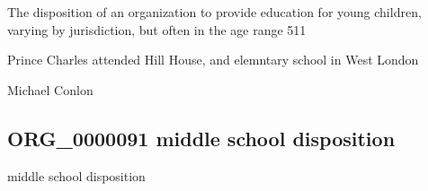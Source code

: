 \documentclass[letterpaper,10pt,english]{sphinxmanual}
\begin{document}
\begin{sphinxShadowBox}

\sphinxAtStartPar
{\hyperref[\detokenize{doc-BFO_0000016::doc}]{}}
\end{sphinxShadowBox}

\begin{sphinxShadowBox}

\sphinxAtStartPar
The disposition of an organization to provide education for young children, varying by jurisdiction, but often in the age range 5\sphinxhyphen{}11
\end{sphinxShadowBox}

\begin{sphinxShadowBox}

\sphinxAtStartPar
{}
\end{sphinxShadowBox}

\begin{sphinxShadowBox}

\sphinxAtStartPar
Prince Charles attended Hill House, and elemntary school in West London
\end{sphinxShadowBox}

\begin{sphinxShadowBox}

\sphinxAtStartPar
Michael Conlon 
\end{sphinxShadowBox}
\begin{quote}

\ignorespaces \end{quote}


\subsection{ORG\_0000091 \sphinxhyphen{} middle school disposition}
\label{\detokenize{doc-ORG_0000091:org-0000091-middle-school-disposition}}\label{\detokenize{doc-ORG_0000091:index-0}}\label{\detokenize{doc-ORG_0000091::doc}}
\begin{sphinxShadowBox}

\sphinxAtStartPar
middle school disposition
\end{sphinxShadowBox}
\end{document}
